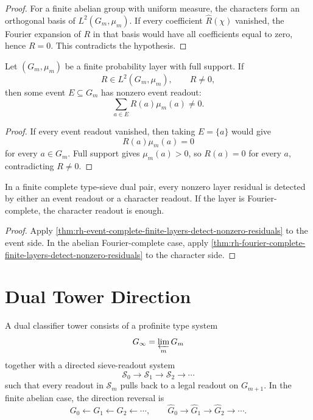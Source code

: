 \begin{proof}
For a finite abelian group with uniform measure, the characters form an
orthogonal basis of $L^2(G_m,\mu_m)$.  If every coefficient
$\widehat R(\chi)$ vanished, the Fourier expansion of $R$ in that basis
would have all coefficients equal to zero, hence $R=0$.  This
contradicts the hypothesis.
\end{proof}

\begin{theorem}
\label{thm:rh-event-complete-finite-layers-detect-nonzero-residuals}
Let $(G_m,\mu_m)$ be a finite probability layer with full support.  If
$$
R\in L^2(G_m,\mu_m),
\qquad
R\ne0,
$$
then some event $E\subseteq G_m$ has nonzero event readout:
$$
\sum_{a\in E}R(a)\mu_m(a)\ne0.
$$
\end{theorem}

\begin{proof}
If every event readout vanished, then taking $E=\{a\}$ would give
$$
R(a)\mu_m(a)=0
$$
for every $a\in G_m$.  Full support gives $\mu_m(a)>0$, so $R(a)=0$ for
every $a$, contradicting $R\ne0$.
\end{proof}

\begin{corollary}
\label{cor:rh-finite-type-sieve-duality-detects-residuals}
In a finite complete type-sieve dual pair, every nonzero layer residual
is detected by either an event readout or a character readout.  If the
layer is Fourier-complete, the character readout is enough.
\end{corollary}

\begin{proof}
Apply
\autoref{thm:rh-event-complete-finite-layers-detect-nonzero-residuals}
to the event side.  In the abelian Fourier-complete case, apply
\autoref{thm:rh-fourier-complete-finite-layers-detect-nonzero-residuals}
to the character side.
\end{proof}

\section{Dual Tower Direction}
\label{sec:rh-prime-sieve-duality-tower-direction}

\begin{definition}
\label{def:rh-dual-classifier-tower}
A dual classifier tower consists of a profinite type system
$$
G_\infty=\varprojlim_mG_m
$$
together with a directed sieve-readout system
$$
\mathcal S_0\to\mathcal S_1\to\mathcal S_2\to\cdots
$$
such that every readout in $\mathcal S_m$ pulls back to a legal readout
on $G_{m+1}$.  In the finite abelian case, the direction reversal is
$$
G_0\leftarrow G_1\leftarrow G_2\leftarrow\cdots,
\qquad
\widehat G_0\to\widehat G_1\to\widehat G_2\to\cdots.
$$
\end{definition}

